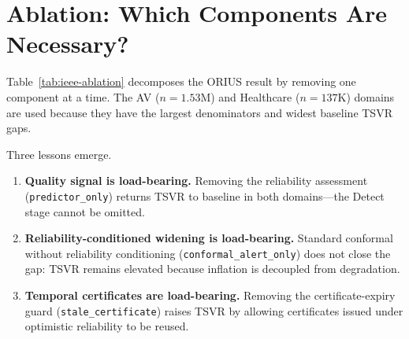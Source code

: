 
\section{Ablation: Which Components Are Necessary?}
\label{sec:ieee-ablation}

Table~\ref{tab:ieee-ablation} decomposes the ORIUS result by removing one
component at a time.  The AV ($n{=}1.53$M) and Healthcare ($n{=}137$K) domains
are used because they have the largest denominators and widest baseline TSVR gaps.

Three lessons emerge.
\begin{enumerate}[leftmargin=1.25em,itemsep=0.2em]
\item \textbf{Quality signal is load-bearing.}
  Removing the reliability assessment (\texttt{predictor\_only})
  returns TSVR to baseline in both domains---the Detect stage cannot be omitted.
\item \textbf{Reliability-conditioned widening is load-bearing.}
  Standard conformal without reliability conditioning
  (\texttt{conformal\_alert\_only}) does not close the gap:
  TSVR remains elevated because inflation is decoupled from degradation.
\item \textbf{Temporal certificates are load-bearing.}
  Removing the certificate-expiry guard (\texttt{stale\_certificate})
  raises TSVR by allowing certificates issued under optimistic reliability to be reused.
\end{enumerate}

